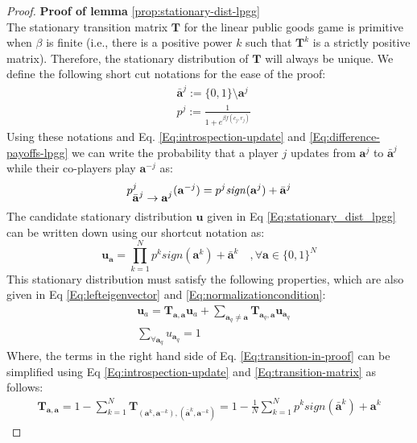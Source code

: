 \documentclass[11pt]{article}
\theoremstyle{plainCl1}
\theoremstyle{plainCl2}
\newcommand{\abf}{\mathbf{a}}
\newcommand{\T}{\mathbf{T}}
\newcommand{\ubf}{\mathbf{u}}
\begin{document}
\clearpage
\newpage
\begin{proof}
\textbf{Proof of lemma} \ref{prop:stationary-dist-lpgg} \\ 
The stationary transition matrix $\T$ for the linear public goods game is primitive when $\beta$ is finite (i.e., there is a positive power $k$ such that $\T^k$ is a strictly positive matrix). Therefore, the stationary distribution of $\T$ will always be unique. We define the following short cut notations for the ease of the proof: 
\begin{eqnarray}
&\bar{\abf}^j := \{0,1\} \setminus \abf^j  \\ 
&p^j := \frac{1}{1 + \displaystyle e^{\beta f(c_j, r_j)}}
\end{eqnarray}
Using these notations and Eq. \ref{Eq:introspection-update} and \ref{Eq:difference-payoffs-lpgg} we can write the probability that a player $j$ updates from $\abf^j$ to $\bar{\abf}^j$ while their co-players play $\abf^{-j}$ as:
\begin{equation}
p^j_{\displaystyle \bar{\abf}^j  \to \abf^j} (\abf^{-j}) = p^j \mathit{sign}(\abf^j) + \bar{\abf}^j \\ \\
\end{equation}
The candidate stationary distribution $\ubf$ given in Eq \ref{Eq:stationary_dist_lpgg} can be written down using our shortcut notation as: 
\begin{equation}
\label{Eq:stationary-dist-shortcut}
\ubf_\abf = \prod_{k = 1}^{N}  p^k \mathit{sign}(\abf^k) + \bar{\abf}^k \quad ,\forall \abf \in \{0,1\}^N
\end{equation}
This stationary distribution must satisfy the following properties, which are also given in Eq  \ref{Eq:lefteigenvector} and \ref{Eq:normalizationcondition}:
\begin{align}
\label{Eq:transition-in-proof}
&\ubf_a = \T_{\abf,\abf} \ubf_a  + \sum_{\abf_q \neq \abf} \T_{\abf_q, \abf} \ubf_{\abf_q}  \\ 
\label{Eq:normalization-in-proof}
&\sum_{\forall \abf_q} u_{\abf_q}= 1
\end{align}
Where, the terms in the right hand side of Eq. \ref{Eq:transition-in-proof} can be simplified using Eq \ref{Eq:introspection-update} and \ref{Eq:transition-matrix} as follows:
\begin{eqnarray}
\T_{\abf,\abf} = 1 - \sum_{k=1}^{N} \T_{(\abf^k, \abf^{-k}), (\bar{\abf}^k,\abf^{-k})} = 1 - \frac{1}{N} \sum_{k=1}^{N} p^k \textit{sign}(\bar{\abf}^k) + \abf^k 
\label{Eq:first-term-rhs-proof}

\end{eqnarray}
\end{proof}
\end{document}
